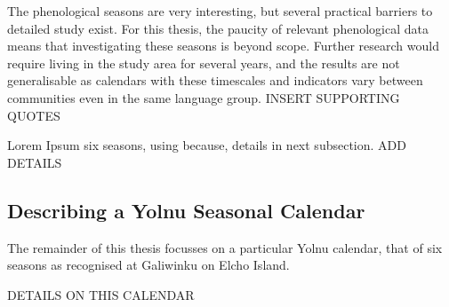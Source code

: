 The phenological seasons are very interesting, but several practical barriers to detailed study exist.
For this thesis, the paucity of relevant phenological data means that
investigating these seasons is beyond scope.
Further research would require living in the study area for several years,
and the results are not generalisable as calendars with these timescales and indicators
vary between communities even in the same language group.  INSERT SUPPORTING QUOTES


Lorem Ipsum six seasons, using because, details in next subsection.  ADD DETAILS



\subsection{Describing a Yolnu Seasonal Calendar}

The remainder of this thesis focusses on a particular Yolnu calendar,
that of six seasons as recognised at Galiwinku on Elcho Island.

DETAILS ON THIS CALENDAR
